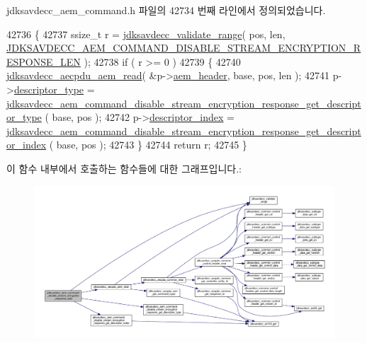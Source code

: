 jdksavdecc\+\_\+aem\+\_\+command.\+h 파일의 42734 번째 라인에서 정의되었습니다.


\begin{DoxyCode}
42736 \{
42737     ssize\_t r = \hyperlink{group__util_ga9c02bdfe76c69163647c3196db7a73a1}{jdksavdecc\_validate\_range}( pos, len, 
      \hyperlink{group__command__disable__stream__encryption__response_gaf504a02072cd6345fccae3b1330fc376}{JDKSAVDECC\_AEM\_COMMAND\_DISABLE\_STREAM\_ENCRYPTION\_RESPONSE\_LEN}
       );
42738     \textcolor{keywordflow}{if} ( r >= 0 )
42739     \{
42740         \hyperlink{group__aecpdu__aem_gae2421015dcdce745b4f03832e12b4fb6}{jdksavdecc\_aecpdu\_aem\_read}( &p->\hyperlink{structjdksavdecc__aem__command__disable__stream__encryption__response_ae1e77ccb75ff5021ad923221eab38294}{aem\_header}, base, pos, len );
42741         p->\hyperlink{structjdksavdecc__aem__command__disable__stream__encryption__response_ab7c32b6c7131c13d4ea3b7ee2f09b78d}{descriptor\_type} = 
      \hyperlink{group__command__disable__stream__encryption__response_ga05227a24d6e4b6b5448fffebf489a500}{jdksavdecc\_aem\_command\_disable\_stream\_encryption\_response\_get\_descriptor\_type}
      ( base, pos );
42742         p->\hyperlink{structjdksavdecc__aem__command__disable__stream__encryption__response_a042bbc76d835b82d27c1932431ee38d4}{descriptor\_index} = 
      \hyperlink{group__command__disable__stream__encryption__response_ga8f3f8650c4849e321fef206c2d160b56}{jdksavdecc\_aem\_command\_disable\_stream\_encryption\_response\_get\_descriptor\_index}
      ( base, pos );
42743     \}
42744     \textcolor{keywordflow}{return} r;
42745 \}
\end{DoxyCode}


이 함수 내부에서 호출하는 함수들에 대한 그래프입니다.\+:
\nopagebreak
\begin{figure}[H]
\begin{center}
\leavevmode
\includegraphics[width=350pt]{group__command__disable__stream__encryption__response_gabc0833f55df16dca2ebf687dd42262c1_cgraph}
\end{center}
\end{figure}


